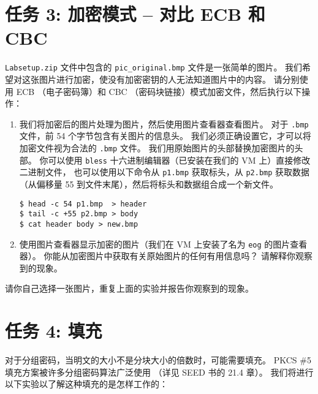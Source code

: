 \section{任务 3: 加密模式 -- 对比 ECB 和 CBC}

\texttt{Labsetup.zip} 文件中包含的 {\tt pic\_original.bmp} 文件是一张简单的图片。
我们希望对这张图片进行加密，使没有加密密钥的人无法知道图片中的内容。
请分别使用 ECB （电子密码簿）和 CBC （密码块链接）模式加密文件，然后执行以下操作：

\begin{enumerate}
\item 我们将加密后的图片处理为图片，然后使用图片查看器查看图片。
对于 {\tt .bmp} 文件，前 54 个字节包含有关图片的信息头。
我们必须正确设置它，才可以将加密文件视为合法的 {\tt .bmp} 文件。
我们用原始图片的头部替换加密图片的头部。
你可以使用 \texttt{bless} 十六进制编辑器（已安装在我们的 VM 上）直接修改二进制文件，
也可以使用以下命令从 \texttt{p1.bmp} 获取标头，从 \texttt{p2.bmp} 获取数据
（从偏移量 55 到文件末尾），然后将标头和数据组合成一个新文件。

\begin{lstlisting}
$ head -c 54 p1.bmp  > header
$ tail -c +55 p2.bmp > body
$ cat header body > new.bmp
\end{lstlisting}


\item 使用图片查看器显示加密的图片（我们在 VM 上安装了名为 \texttt{eog} 的图片查看器）。
你能从加密图片中获取有关原始图片的任何有用信息吗？
请解释你观察到的现象。

\end{enumerate}

请你自己选择一张图片，重复上面的实验并报告你观察到的现象。




\section{任务 4: 填充}

对于分组密码，当明文的大小不是分块大小的倍数时，可能需要填充。
PKCS \#5 填充方案被许多分组密码算法广泛使用
（详见 SEED 书的 21.4 章）。
我们将进行以下实验以了解这种填充的是怎样工作的：

